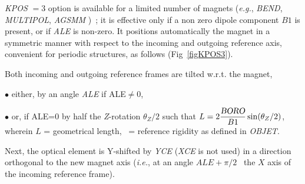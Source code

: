 \noindent \textsl{KPOS} $=3 $ option is available for a limited number of  
 magnets  (\emph{e.g.}, \textsl{BEND}, \textsl{MULTIPOL}, \textsl{AGSMM} )~; 
it is effective only if a non zero dipole component $B1$ is present, or if  \textsl{ALE} is non-zero. 
It positions automatically the magnet in a symmetric manner with respect to the incoming and outgoing reference 
axis, convenient for periodic structures, as follows (Fig~\ref{figKPOS3}). 

\medskip
 
\noindent Both incoming and outgoing reference frames are  tilted w.r.t. the magnet,  

 $\bullet$ either,  by an angle \textsl{ALE}  if ALE$\not =$0, 

 $\bullet$ or, if ALE=0  by  half the \textsl{Z}-rotation $\theta_Z/2$ such that $ L = 
2 \dfrac{\textsl{BORO}}{B1} \sin({\theta_Z}/{2})$,  wherein $L$ = geometrical length, 
\BORO\  = reference rigidity as defined in \textsl{OBJET}.

\noindent Next, the optical element is  Y-shifted by \textsl{YCE} (\textsl{XCE} is not used) in a 
direction orthogonal to the new magnet axis (\emph{i.e.}, at an angle $ALE+\pi/2$ \wrt\ the $X$ axis of the incoming 
reference frame).



